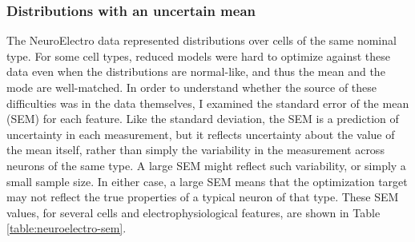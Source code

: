 \subsubsection{Distributions with an uncertain mean}
The NeuroElectro data represented distributions over cells of the same nominal type.
For some cell types, reduced models were hard to optimize against these data even when the distributions are normal-like, and thus the mean and the mode are well-matched.
In order to understand whether the source of these difficulties was in the data themselves, I examined the standard error of the mean (SEM) for each feature.
Like the standard deviation, the SEM is a prediction of uncertainty in each measurement, but it reflects uncertainty about the value of the mean itself, rather than simply the variability in the measurement across neurons of the same type.
A large SEM might reflect such variability, or simply a small sample size. 
In either case, a large SEM means that the optimization target may not reflect the true properties of a typical neuron of that type.
These SEM values, for several cells and electrophysiological features, are shown in Table \ref{table:neuroelectro-sem}.

\begin{table}
\caption[Standard Error of the Mean across NeuroElectro Data Sources]{The standard error of the mean (SEM) described the uncertainty that the sample mean value of a feature (across neurons) is close to the population mean.
The SEM values describe that uncertainty for the sample means of various features for each of 4 cell types in NeuroElectro.}
\label{table:neuroelectro-sem}
\end{table}

